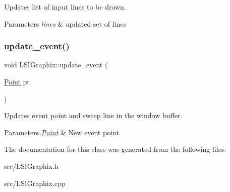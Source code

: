 Updates list of input lines to be drawn. 
\begin{DoxyParams}{Parameters}
{\em lines} & updated set of lines \\
\hline
\end{DoxyParams}
\mbox{\label{classLSIGraphix_a136dca7736d6a885ef9b40824808c447}} 
\subsubsection{\texorpdfstring{update\+\_\+event()}{update\_event()}}
{\footnotesize\ttfamily void L\+S\+I\+Graphix\+::update\+\_\+event (\begin{DoxyParamCaption}\item[{\hyperlink{classPoint}{Point}}]{pt }\end{DoxyParamCaption})}

Updates event point and sweep line in the window buffer. 
\begin{DoxyParams}{Parameters}
{\em \hyperlink{classPoint}{Point}} & New event point. \\
\hline
\end{DoxyParams}


The documentation for this class was generated from the following files\+:\begin{DoxyCompactItemize}
\item 
src/L\+S\+I\+Graphix.\+h\item 
src/L\+S\+I\+Graphix.\+cpp\end{DoxyCompactItemize}

